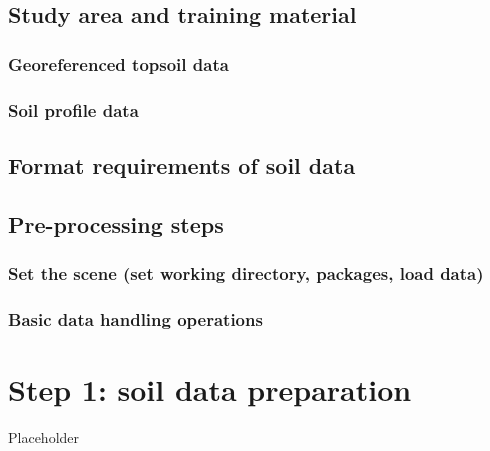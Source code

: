 \documentclass[
  10pt,
  b5paper,
  oneside]{book}
\begin{document}
\hypertarget{study-area-and-training-material}{%
\section{Study area and training material}\label{study-area-and-training-material}}

\hypertarget{georeferenced-topsoil-data}{%
\subsection{Georeferenced topsoil data}\label{georeferenced-topsoil-data}}

\hypertarget{soil-profile-data}{%
\subsection{Soil profile data}\label{soil-profile-data}}

\hypertarget{preproc}{%
\section{Format requirements of soil data}\label{preproc}}

\hypertarget{pre-processing-steps}{%
\section{Pre-processing steps}\label{pre-processing-steps}}

\hypertarget{set-the-scene-set-working-directory-packages-load-data}{%
\subsection{Set the scene (set working directory, packages, load data)}\label{set-the-scene-set-working-directory-packages-load-data}}

\hypertarget{basic-data-handling-operations}{%
\subsection{Basic data handling operations}\label{basic-data-handling-operations}}

\hypertarget{step-1-soil-data-preparation}{%
\chapter{Step 1: soil data preparation}\label{step-1-soil-data-preparation}}

Placeholder
\end{document}
